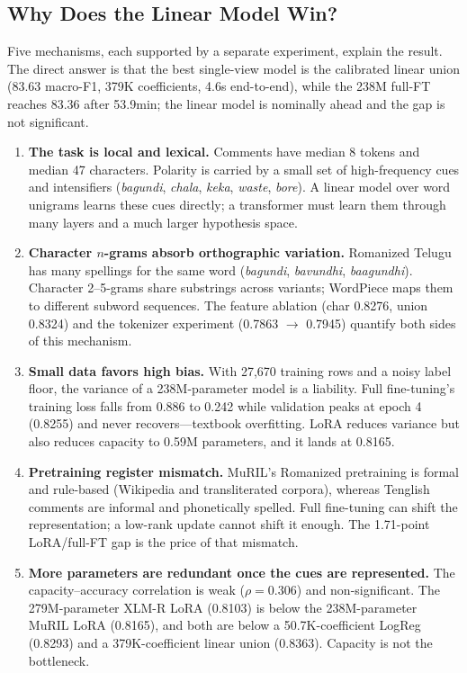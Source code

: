 \documentclass[10pt,journal]{IEEEtran}
\begin{document}
\subsection{Why Does the Linear Model Win?}
Five mechanisms, each supported by a separate experiment, explain the result. The direct answer is that the best single-view model is the calibrated linear union (83.63 macro-F1, 379K coefficients, 4.6s end-to-end), while the 238M full-FT reaches 83.36 after 53.9min; the linear model is nominally ahead and the gap is not significant.
\begin{enumerate}
\item \textbf{The task is local and lexical.} Comments have median 8 tokens and median 47 characters. Polarity is carried by a small set of high-frequency cues and intensifiers (\textit{bagundi}, \textit{chala}, \textit{keka}, \textit{waste}, \textit{bore}). A linear model over word unigrams learns these cues directly; a transformer must learn them through many layers and a much larger hypothesis space.
\item \textbf{Character $n$-grams absorb orthographic variation.} Romanized Telugu has many spellings for the same word (\textit{bagundi}, \textit{bavundhi}, \textit{baagundhi}). Character 2--5-grams share substrings across variants; WordPiece maps them to different subword sequences. The feature ablation (char 0.8276, union 0.8324) and the tokenizer experiment (0.7863 $\rightarrow$ 0.7945) quantify both sides of this mechanism.
\item \textbf{Small data favors high bias.} With 27{,}670 training rows and a noisy label floor, the variance of a 238M-parameter model is a liability. Full fine-tuning's training loss falls from 0.886 to 0.242 while validation peaks at epoch 4 (0.8255) and never recovers---textbook overfitting. LoRA reduces variance but also reduces capacity to 0.59M parameters, and it lands at 0.8165.
\item \textbf{Pretraining register mismatch.} MuRIL's Romanized pretraining is formal and rule-based (Wikipedia and transliterated corpora), whereas Tenglish comments are informal and phonetically spelled. Full fine-tuning can shift the representation; a low-rank update cannot shift it enough. The 1.71-point LoRA/full-FT gap is the price of that mismatch.
\item \textbf{More parameters are redundant once the cues are represented.} The capacity--accuracy correlation is weak ($\rho=0.306$) and non-significant. The 279M-parameter XLM-R LoRA (0.8103) is below the 238M-parameter MuRIL LoRA (0.8165), and both are below a 50.7K-coefficient LogReg (0.8293) and a 379K-coefficient linear union (0.8363). Capacity is not the bottleneck.
\end{enumerate}
\end{document}
